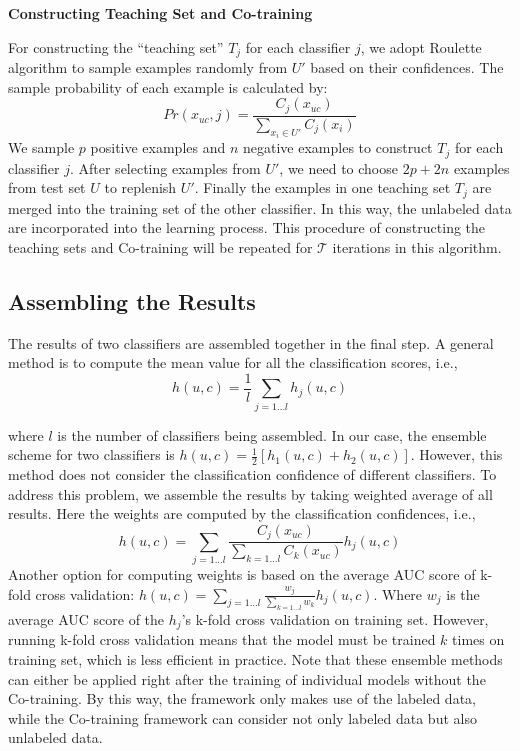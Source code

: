     
    \noindent \textbf{Constructing Teaching Set and Co-training}
    
    For constructing the ``teaching set'' $T_j$ for each classifier $j$, we adopt Roulette algorithm \cite{Back:1996:EAT:229867} to sample examples randomly from $U'$ based on their confidences. The sample probability of each example is calculated by:
     \begin{equation}
     Pr(x_{uc}, j)=\frac{C_j(x_{uc})}{\sum_{x_i\in U'}C_j(x_i)}
     \end{equation}
     We sample $p$ positive examples and $n$ negative examples to construct $T_j$ for each classifier $j$.
    After selecting examples from $U'$, we need to choose $2p+2n$ examples from test set $U$ to replenish $U'$. Finally the examples in one teaching set $T_j$ are merged into the training set of the other classifier. In this way, the unlabeled data are incorporated into the learning process. This procedure of constructing the teaching sets and Co-training will be repeated for $\mathcal{T}$  iterations in this algorithm.
    \subsection{Assembling the Results}
    \label{sec:assemble}
    The results of two classifiers are assembled together in the final step. A general method is to compute the mean value for all the classification scores, i.e.,
    \begin{equation}
    h(u,c) =\frac{1}{l}\sum_{j=1...l}h_j(u, c)
    \end{equation}
    
    where $l$ is the number of classifiers being assembled. In our case, the ensemble scheme for two classifiers is $h(u,c) = \frac{1}{2}[h_1(u,c)+h_2(u,c)]$. However, this method does not consider the classification confidence of different classifiers. To address this problem, we assemble the results by taking weighted average of all results. Here the weights are computed by the classification confidences, i.e.,
    \begin{equation}
    h(u,c)=\sum_{j=1...l}\frac{C_j(x_{uc})}{\sum_{k=1...l}C_k(x_{uc})}h_j(u,c)
    \end{equation}
    Another option for computing weights is based on the average AUC score of k-fold cross validation: $h(u,c)=\sum_{j=1...l}\frac{w_j}{\sum_{k=1...l}w_k}h_j(u,c)$. Where $w_j$ is the average AUC score of the $h_j$'s k-fold cross validation on training set. However, running k-fold cross validation means that the model must be trained $k$ times on training set, which is less efficient in practice. 
    Note that these ensemble methods can either be applied right after the training of individual models without the Co-training. By this way, the framework only makes use of the labeled data, while the Co-training framework can consider not only labeled data but also unlabeled data.